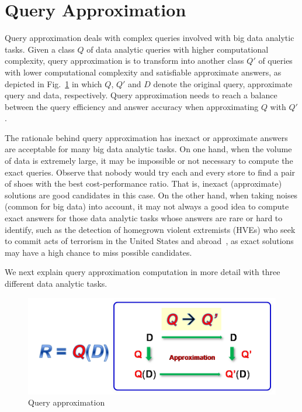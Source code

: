 \section{Query Approximation}
\label{sec-query}





Query approximation deals with complex queries involved with big data analytic tasks. Given a class $Q$ of data analytic queries with higher computational complexity,  query approximation is to transform into another class $Q'$ of queries with lower computational complexity and satisfiable approximate answers, as depicted in Fig.~\ref{fig-tech-queryappro} in which $Q$, $Q'$ and $D$ denote the original query, approximate query and data, respectively. Query approximation needs to reach a balance between the query efficiency and answer accuracy when approximating $Q$ with $Q'$.

The rationale behind query approximation has inexact or approximate answers are acceptable for many big data analytic tasks.
On one hand, when the volume of data is extremely large, it may be impossible or not necessary to compute the exact queries.
Observe that nobody would try each and every store to find a pair of shoes with the best cost-performance ratio.
That is, inexact (approximate) solutions are good candidates in this case.
%
On the other hand, when taking noises (common for big data) into account, it may not always a good idea to compute exact answers
for those data analytic tasks whose answers are rare or hard to identify, such as the detection of homegrown violent extremists (HVEs) who seek to commit acts of terrorism in the United States and abroad~\cite{HungJ16}, as exact solutions may have a high chance to miss possible candidates.

We next explain query approximation computation in more detail with three different data analytic tasks.



\begin{figure}[tb!]
  \vspace{-1ex}
  \begin{center}
  \includegraphics[scale=0.45]{./queryApprox.png}
  \end{center}
  \vspace{-3ex}
  \caption{Query approximation}\label{fig-tech-queryappro}
  \vspace{-2ex}
\end{figure}


